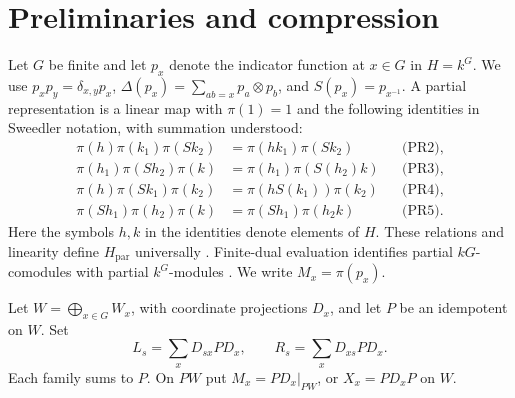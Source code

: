 \documentclass[11pt]{amsart}
\theoremstyle{definition}
\newcommand{\paralg}{H_{\mathrm{par}}}
\begin{document}
\section{Preliminaries and compression}
Let $G$ be finite and let $p_x$ denote the indicator function at $x\in G$ in $H=k^G$. We use $p_xp_y=\delta_{x,y}p_x$, $\Delta(p_x)=\sum_{ab=x}p_a\otimes p_b$, and $S(p_x)=p_{x^{-1}}$. A partial representation is a linear map with $\pi(1)=1$ and the following identities in Sweedler notation, with summation understood:
\begin{align*}
\pi(h)\pi(k_1)\pi(Sk_2)&=\pi(hk_1)\pi(Sk_2) &&\text{(PR2)},\\
\pi(h_1)\pi(Sh_2)\pi(k)&=\pi(h_1)\pi(S(h_2)k) &&\text{(PR3)},\\
\pi(h)\pi(Sk_1)\pi(k_2)&=\pi(hS(k_1))\pi(k_2) &&\text{(PR4)},\\
\pi(Sh_1)\pi(h_2)\pi(k)&=\pi(Sh_1)\pi(h_2k) &&\text{(PR5)}.
\end{align*}
Here the symbols $h,k$ in the identities denote elements of $H$. These relations and linearity define $\paralg$ universally \cite{ABV15}. Finite-dual evaluation identifies partial $kG$-comodules with partial $k^G$-modules \cite[Theorem~1.6]{BHSV}. We write $M_x=\pi(p_x)$.

Let $W=\bigoplus_{x\in G}W_x$, with coordinate projections $D_x$, and let $P$ be an idempotent on $W$. Set
\[
 L_s=\sum_xD_{sx}PD_x,\qquad R_s=\sum_xD_{xs}PD_x.
\]
Each family sums to $P$. On $PW$ put $M_x=PD_x|_{PW}$, or $X_x=PD_xP$ on $W$.
\end{document}
